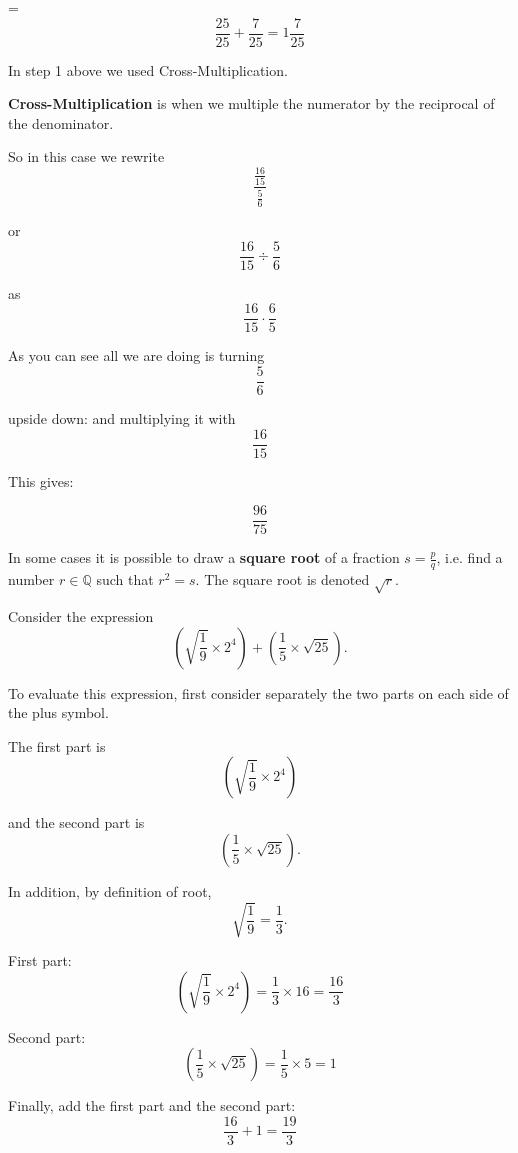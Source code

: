 \documentclass[12pt,a4paper]{article}
\theoremstyle{regla}
\theoremstyle{remark}
\theoremstyle{definition}
\theoremstyle{nonumberbreak}
\begin{document}
\begin{xmpl}
= $$\frac{25}{25}+\frac{7}{25} 
=1\frac{7}{25} $$

In step 1 above we used Cross-Multiplication. 

\begin{defn}
{\bf Cross-Multiplication} is when we multiple the numerator by the reciprocal of the denominator. 
\end{defn}
So in this case we rewrite
$$\frac{\frac{16}{15}}{\frac{5}{6}}$$

or $$\frac{16}{15} \div \frac{5}{6}$$

as $$\frac{16}{15} \cdot \frac{6}{5}$$

As you can see all we are doing is turning $$\frac{5}{6}$$

upside down: and multiplying it with $$\frac{16}{15}$$

This gives:

$$\frac{96}{75}$$

\end{xmpl}

In some cases it is possible to draw a \textbf{square root} of a fraction $s=\frac{p}{q}$, i.e. find a number $r\in \mathbb{Q}$ such that $r^2=s$. The square root is denoted $\sqrt{r}$.

\begin{xmpl}

Consider the expression $$(\sqrt{\frac{1}{9}} \times 2^4) + (\frac{1}{5} \times \sqrt{25}).$$

To evaluate this expression, first consider separately the two parts on each side of the plus symbol. 

The first part is $$(\sqrt{\frac{1}{9}} \times 2^4)$$

and the second part is $$(\frac{1}{5} \times \sqrt{25}).$$

 

In addition, by definition of root, $$\sqrt{\frac{1}{9}} = \frac{1}{3}.$$

 

First part: $$(\sqrt{\frac{1}{9}} \times 2^4) = \frac{1}{3} \times 16 = \frac{16}{3}$$

Second part: $$(\frac{1}{5} \times \sqrt{25}) = \frac{1}{5} \times 5 = 1$$

Finally, add the first part and the second part: $$\frac{16}{3} + 1 = \frac{19}{3}$$
\end{xmpl}
\end{document}
